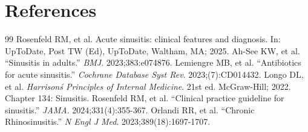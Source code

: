 \section*{References}
\begin{thebibliography}{99}
 Rosenfeld RM, et al. Acute sinusitis: clinical features and diagnosis. In: UpToDate, Post TW (Ed), UpToDate, Waltham, MA; 2025.
 Ah-See KW, et al. ``Sinusitis in adults.'' \emph{BMJ}. 2023;383:e074876.
 Lemiengre MB, et al. ``Antibiotics for acute sinusitis.'' \emph{Cochrane Database Syst Rev}. 2023;(7):CD014432.
 Longo DL, et al. \emph{Harrison\'s Principles of Internal Medicine}. 21st ed. McGraw-Hill; 2022. Chapter 134: Sinusitis.
 Rosenfeld RM, et al. ``Clinical practice guideline for sinusitis.'' \emph{JAMA}. 2024;331(4):355-367.
 Orlandi RR, et al. ``Chronic Rhinosinusitis.'' \emph{N Engl J Med}. 2023;389(18):1697-1707.
\end{thebibliography}
